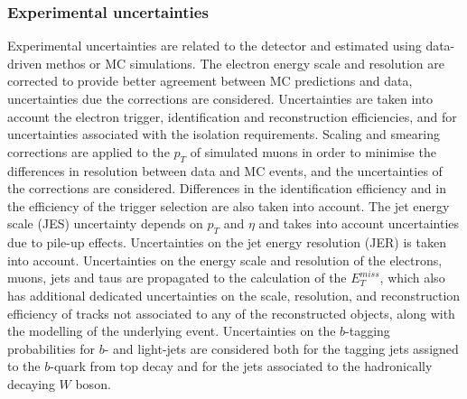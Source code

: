 \documentclass[letterpaper,12pt]{article}
\begin{document}
\subsubsection{Experimental uncertainties}

Experimental uncertainties are related to the detector and estimated using 
data-driven methos or MC simulations. 
The electron energy scale and resolution are corrected to 
provide better agreement between MC predictions and data, uncertainties 
due the corrections are considered. Uncertainties are taken into account the 
electron trigger, identification and reconstruction efficiencies, and for 
uncertainties associated with the isolation requirements. Scaling and smearing 
corrections are applied to the $p_T$ of simulated muons in order to minimise the differences 
in resolution between data and MC events, and the uncertainties of the corrections are considered. 
Differences in the identification efficiency and in the efficiency of the trigger selection are 
also taken into account. The jet energy scale (JES) uncertainty depends on $p_T$ and $\eta$ and 
takes into account uncertainties due to pile-up effects. Uncertainties on the jet energy resolution (JER) 
is taken into account. Uncertainties on the energy scale and resolution of 
the electrons, muons, jets and taus are propagated to the calculation of the $E_T^{miss}$, 
which also has additional dedicated uncertainties on the scale, resolution, and 
reconstruction efficiency of tracks not associated to any of the reconstructed objects,
 along with the modelling of the underlying event. Uncertainties on the $b$-tagging probabilities 
 for $b$- and light-jets are considered both for the tagging jets assigned to the $b$-quark 
 from top decay and for the jets associated to the hadronically decaying $W$ boson.
\end{document}
